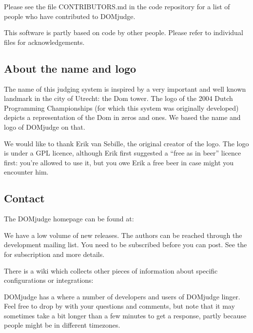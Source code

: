 \documentclass[a4paper,10pt,english,openany]{sphinxmanual}
\let\sphinxpxdimen\pdfpxdimen\else\newdimen\sphinxpxdimen
\begin{document}
\sphinxAtStartPar
Please see the file CONTRIBUTORS.md in the code repository for a list
of people who have contributed to DOMjudge.

\sphinxAtStartPar
This software is partly based on code by other people. Please refer to
individual files for acknowledgements.


\subsection{About the name and logo}
\label{\detokenize{overview:about-the-name-and-logo}}
\noindent{\hspace*{\fill}\sphinxincludegraphics[width=100\sphinxpxdimen]{{DOMjudgelogo}.pdf}}

\sphinxAtStartPar
The name of this judging system is inspired by a very important and well known
landmark in the city of Utrecht: the Dom tower.  The logo of the 2004 Dutch
Programming Championships (for which this system was originally developed)
depicts a representation of the Dom in zeros and ones. We based the name and
logo of DOMjudge on that.

\sphinxAtStartPar
We would like to thank Erik van Sebille, the original creator of the logo. The
logo is under a GPL licence, although Erik first suggested a “free as in beer”
licence first: you’re allowed to use it, but you owe Erik a free beer in case
might you encounter him.


\subsection{Contact}
\label{\detokenize{overview:contact}}
\sphinxAtStartPar
The DOMjudge homepage can be found at: 

\sphinxAtStartPar
We have a low volume 
of new releases.
The authors can be reached through the development mailing list.
You need to be subscribed before you can post. See the
for subscription and more details.

\sphinxAtStartPar
There is a wiki which collects other pieces of information about
specific configurations or integrations:

\sphinxAtStartPar
DOMjudge has a 
where a number of developers and users of
DOMjudge linger. Feel free to drop by with your questions and comments,
but note that it may sometimes take a bit longer than a few minutes to
get a response, partly because people might be in different timezones.
\end{document}

